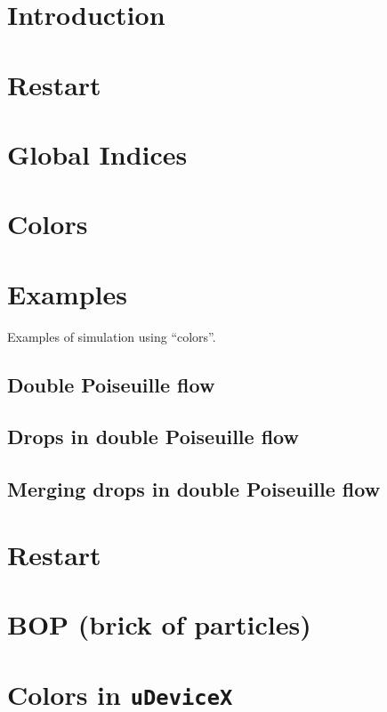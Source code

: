 \documentclass{article}
\begin{document}
\maketitle

\section{Introduction}


\section{Restart}


\section{Global Indices}


\section{Colors}


\section{Examples}
Examples of simulation using ``colors''.

\subsection{Double Poiseuille flow}


\subsection{Drops in double Poiseuille flow}


\subsection{Merging drops in double Poiseuille flow}


\appendix
\section{Restart}\label{a:restart}


\section{BOP (brick of particles)}\label{a:bop}


\section{Colors in \texttt{uDeviceX}}\label{a:color}

\end{document}

